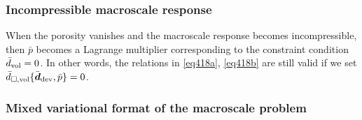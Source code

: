 \documentclass[10pt,a4paper]{article}
\begin{document}
\subsubsection{Incompressible macroscale response}

When the porosity vanishes and the macroscale response becomes incompressible, then $\bar{p}$ becomes a Lagrange multiplier corresponding to the constraint condition $\bar{d}_{\mathrm{vol}} = 0$. In other words, the relations in \eqref{eq418a}, \eqref{eq418b} are still valid if we set $\bar{d}_{\Box,\mathrm{vol}}\{\bar{\boldsymbol{d}}_{\mathrm{dev}},\bar p\} = 0$.

\subsubsection{Mixed variational format of the macroscale problem}
\end{document}
